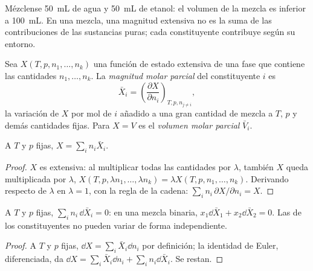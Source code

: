 Mézclense \qty{50}{mL} de agua y \qty{50}{mL} de etanol: el volumen de la
mezcla es inferior a \qty{100}{mL}. En una mezcla, una magnitud extensiva no es
la suma de las contribuciones de las sustancias puras; cada constituyente
contribuye según su entorno.

\begin{definition}\label{def:b2:chemical-potential:partial-molar}
Sea $X(T, p, n_1, \dots, n_k)$ una función de estado extensiva de una fase
que contiene las cantidades $n_1, \dots, n_k$. La \emph{magnitud molar
parcial} del constituyente $i$ es
\[
  \bar X_i = \left(\frac{\partial X}{\partial n_i}\right)_{T, p, n_{j \ne i}} ,
\]
la variación de $X$ por mol de $i$ añadido a una gran cantidad de mezcla
a $T$, $p$ y demás cantidades fijas. Para $X = V$ es el \emph{volumen
molar parcial} $\bar V_i$.
\end{definition}

\begin{theorem}\label{thm:b2:chemical-potential:euler}
A $T$ y $p$ fijas, $X = \sum_i n_i\bar X_i$.
\end{theorem}

\begin{proof}
$X$ es extensiva: al multiplicar todas las cantidades por $\lambda$, también $X$ queda multiplicada por
$\lambda$, $X(T, p, \lambda n_1, \dots, \lambda n_k) = \lambda X(T, p, n_1,
\dots, n_k)$. Derivando respecto de $\lambda$ en $\lambda = 1$, con
la regla de la cadena: $\sum_i n_i\,\partial X/\partial n_i = X$.
\end{proof}

\begin{proposition}\label{prop:b2:chemical-potential:gibbs-duhem}
A $T$ y $p$ fijas, $\sum_i n_i\,\dd\bar X_i = 0$: en una mezcla binaria,
$x_1\dd\bar X_1 + x_2\dd\bar X_2 = 0$. Las  de los
constituyentes no pueden variar de forma independiente.
\end{proposition}

\begin{proof}
A $T$ y $p$ fijas, $\dd X = \sum_i\bar X_i\dd n_i$ por definición; la identidad de
Euler, diferenciada, da $\dd X = \sum_i\bar X_i\dd n_i + \sum_i
n_i\dd\bar X_i$. Se restan.
\end{proof}

